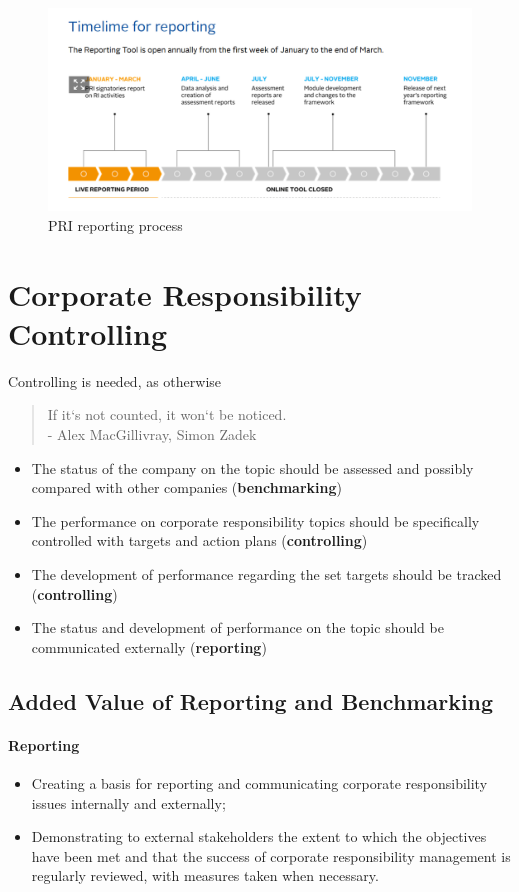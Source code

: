 \documentclass[11pt]{article}
\theoremstyle{definition}
\begin{document}
\begin{figure}[H]
	\centering
	\includegraphics[width=0.8\linewidth]{img/PRI_reporting_process}
	\caption{PRI reporting process}
	\label{fig:prireportingprocess}
\end{figure}

\section{Corporate Responsibility Controlling}
Controlling is needed, as otherwise
\begin{quote}
	If it‘s not counted, it won‘t be noticed.\\
	\hspace*{1em} - Alex MacGillivray, Simon Zadek
\end{quote}
\begin{itemize}
	\item The status of the company on the topic should be assessed and possibly compared with other companies (\textbf{benchmarking})
	\item The performance on corporate responsibility topics should be specifically controlled with targets and action plans (\textbf{controlling})
	\item The development of performance regarding the set targets should be tracked (\textbf{controlling})
	\item The status and development of performance on the topic should be communicated externally (\textbf{reporting})
\end{itemize}

\subsection{Added Value of Reporting and Benchmarking}
\paragraph{Reporting}
\begin{itemize}
	\item Creating a basis for reporting and communicating corporate responsibility issues internally and externally;
	\item Demonstrating to external stakeholders the extent to which the objectives have been met and that the success of corporate responsibility management is regularly reviewed, with measures taken when necessary.
\end{itemize}
\end{document}
